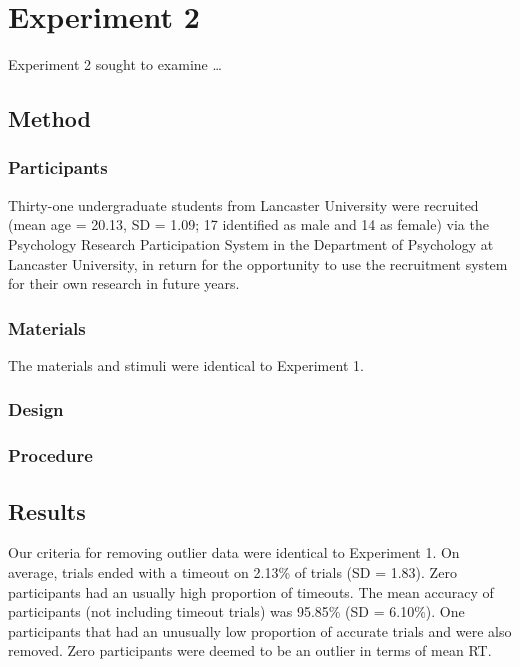 \documentclass[
  man]{apa7}
\begin{document}
\hypertarget{experiment-2}{%
\section{Experiment 2}\label{experiment-2}}

Experiment 2 sought to examine \ldots{}

\hypertarget{method-1}{%
\subsection{Method}\label{method-1}}

\hypertarget{participants-1}{%
\subsubsection{Participants}\label{participants-1}}

Thirty-one undergraduate students from Lancaster University were recruited (mean age = 20.13, SD = 1.09; 17 identified as male and 14 as female) via the Psychology Research Participation System in the Department of Psychology at Lancaster University, in return for the opportunity to use the recruitment system for their own research in future years.

\hypertarget{materials-1}{%
\subsubsection{Materials}\label{materials-1}}

The materials and stimuli were identical to Experiment 1.

\hypertarget{design-1}{%
\subsubsection{Design}\label{design-1}}

\hypertarget{procedure-1}{%
\subsubsection{Procedure}\label{procedure-1}}

\hypertarget{results-1}{%
\subsection{Results}\label{results-1}}

Our criteria for removing outlier data were identical to Experiment 1. On average, trials ended with a timeout on 2.13\% of trials (SD = 1.83). Zero participants had an usually high proportion of timeouts. The mean accuracy of participants (not including timeout trials) was 95.85\% (SD = 6.10\%). One participants that had an unusually low proportion of accurate trials and were also removed. Zero participants were deemed to be an outlier in terms of mean RT.
\end{document}
